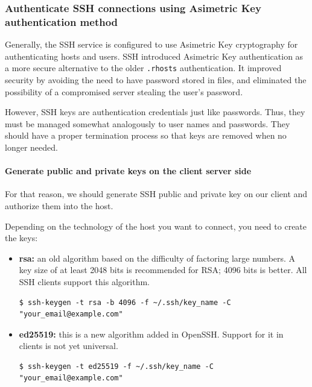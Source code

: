 \documentclass{article}
\newenvironment{codetemplate}[1][]{%
  \mybasecolorbox[#1]
  \itshape
}{%
  \endmybasecolorbox
}
\begin{document}
\subsubsection{Authenticate SSH connections using Asimetric Key authentication method}

Generally, the SSH service is configured to use Asimetric Key cryptography for authenticating hosts and users. SSH introduced Asimetric Key authentication as a more secure alternative to the older \verb|.rhosts| authentication. It improved security by avoiding the need to have password stored in files, and eliminated the possibility of a compromised server stealing the user's password.

However, SSH keys are authentication credentials just like passwords. Thus, they must be managed somewhat analogously to user names and passwords. They should have a proper termination process so that keys are removed when no longer needed.

\paragraph{Generate public and private keys on the client server side}

For that reason, we should generate SSH public and private key on our client and authorize them into the host.

Depending on the technology of the host you want to connect, you need to create the keys:

\begin{itemize}
    \item \textbf{rsa:} an old algorithm based on the difficulty of factoring large numbers. A key size of at least 2048 bits is recommended for RSA; 4096 bits is better. All SSH clients support this algorithm.
\begin{codetemplate}{}
\begin{verbatim}
$ ssh-keygen -t rsa -b 4096 -f ~/.ssh/key_name -C "your_email@example.com" 
\end{verbatim}
\end{codetemplate}
    \item \textbf{ed25519:} this is a new algorithm added in OpenSSH. Support for it in clients is not yet universal.
\begin{codetemplate}{}
\begin{verbatim}
$ ssh-keygen -t ed25519 -f ~/.ssh/key_name -C "your_email@example.com"
\end{verbatim}
\end{codetemplate}
\end{itemize}
\end{document}

